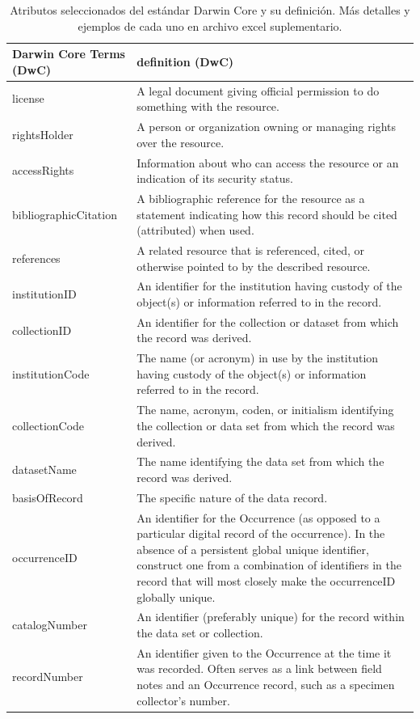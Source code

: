 \documentclass[sn-apa,pdflatex]{sn-jnl}
\begin{document}
\begin{longtable}[t]{>{\raggedright\arraybackslash}p{15em}>{\raggedright\arraybackslash}p{30em}}
\caption{\label{tab:Table1}Atributos seleccionados del estándar Darwin Core y su definición. Más detalles y ejemplos de cada uno en archivo excel suplementario.}\\
\toprule
Darwin Core Terms (DwC) & definition (DwC)\\
\midrule
license & A legal document giving official permission to do something with the resource.\\
rightsHolder & A person or organization owning or managing rights over the resource.\\
accessRights & Information about who can access the resource or an indication of its security status.\\
bibliographicCitation & A bibliographic reference for the resource as a statement indicating how this record should be cited (attributed) when used.\\
references & A related resource that is referenced, cited, or otherwise pointed to by the described resource.\\
\addlinespace
institutionID & An identifier for the institution having custody of the object(s) or information referred to in the record.\\
collectionID & An identifier for the collection or dataset from which the record was derived.\\
institutionCode & The name (or acronym) in use by the institution having custody of the object(s) or information referred to in the record.\\
collectionCode & The name, acronym, coden, or initialism identifying the collection or data set from which the record was derived.\\
datasetName & The name identifying the data set from which the record was derived.\\
\addlinespace
basisOfRecord & The specific nature of the data record.\\
occurrenceID & An identifier for the Occurrence (as opposed to a particular digital record of the occurrence). In the absence of a persistent global unique identifier, construct one from a combination of identifiers in the record that will most closely make the occurrenceID globally unique.\\
catalogNumber & An identifier (preferably unique) for the record within the data set or collection.\\
recordNumber & An identifier given to the Occurrence at the time it was recorded. Often serves as a link between field notes and an Occurrence record, such as a specimen collector's number.\\

\end{longtable}
\end{document}
